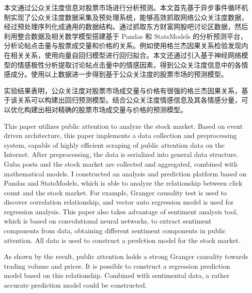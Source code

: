 \begin{cabstract}
  本文通过公众关注度信息对股票市场进行分析预测。本文首先基于异步事件循环机制实现了公众关注度数据采集及预处理系统，能够高效抓取网络公众关注度数据，经过预处理序列化成通用的数据结构。通过抓取东方财富网股吧讨论区数据，然后利用整合数据及相关数学模型搭建基于 Pandas 和 StatsModels 的分析预测平台，分析论帖点击量与股票成交量和价格的关系。例如使用格兰杰因果关系检验发现内在相关关系，使用向量自回归模型进行回归拟合。本文还通过引入基于神经网络模型的情感极性分析提取讨论帖点击量中的情感因素，得到公众关注度信息中的各情感成分。使用以上数据进一步得到基于公众关注度的股票市场的预测模型。

  实验结果表明，公众关注度对股票市场成交量与价格有很强的格兰杰因果关系，基于该关系可以构建出回归预测模型。结合公众关注度情感信息及其各情感分量，可以优化构建出相对精确的股票市场成交量与价格的预测模型。
\end{cabstract}


\begin{eabstract}
  This paper utilizes public attention to analyze the stock market. Based on event driven architecture, this paper implements a data collection and preprocessing system, capable of highly efficient scraping of public attention data on the Internet. After preprocessing, the data is serialized into general data structure. Guba posts and the stock market are collected and aggregated, combined with mathematical models. I constructed an analysis and prediction platform based on Pandas and StatsModels, which is able to analyze the relationship between click count and the stock market. For example, Granger causality test is used to discover correlation relationship, and vector auto regression model is used for regression analysis. This paper also takes advantage of sentiment analysis tool, which is based on convolutional neural networks, to extract sentiment components from data, obtaining different sentiment components in public attention. All data is used to construct a predction model for the stock market.

  As shown by the result, public attention holds a strong Granger causality towards trading volume and prices. It is possible to construct a regression prediction model based on this relationship. Combined with sentimental data, a rather accurate prediction model could be constructed.
\end{eabstract}

